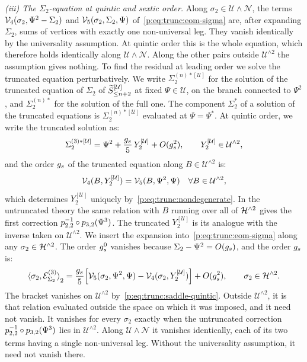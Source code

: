 \emph{(iii) The $\Sigma_2$-equation at quintic and sextic order.}
Along $\sigma_2 \in \mathcal U \wedge \mathcal N$, the terms $\vertex{4}(\sigma_2, \Psi^2 - \Sigma_2)$ and $\vertex{5}(\sigma_2, \Sigma_2, \Psi)$ of~\eqref{p:eq:trunc:eom-sigma} are, after expanding $\Sigma_2$, sums of vertices with exactly one non-universal leg.
They vanish identically by the universality assumption.
At quintic order this is the whole equation, which therefore holds identically along $\mathcal U \wedge \mathcal N$.
Along the other pairs outside $\mathcal U^{\wedge 2}$ the assumption gives nothing.
To find the residual at leading order we solve the truncated equation perturbatively.
We write $\Sigma_2^{(n)*[\mathcal U]}$ for the solution of the truncated equation of $\Sigma_2$ of $\caction[\le n+2]^{[\mathcal U]}$ at fixed $\Psi \in \mathcal U$, on the branch connected to $\Psi^2$, and $\Sigma_2^{(n)*}$ for the solution of the full one.
The component $\Sigma_2^*$ of a solution of the truncated equations is $\Sigma_2^{(n)*[\mathcal U]}$ evaluated at $\Psi = \Psi^*$.
At quintic order, we write the truncated solution as:
\begin{equation}
  \label{p:eq:trunc:expansion}
  \Sigma_2^{(3)*[\mathcal U]}
    = \Psi^2 + \frac{\gs}{5} \, Y_2^{[\mathcal U]} + O(\gs^2),
  \qquad
  Y_2^{[\mathcal U]} \in \mathcal U^{\wedge 2},
\end{equation}
and the order $\gs$ of the truncated equation along $B \in \mathcal U^{\wedge 2}$ is:
\begin{equation}
  \label{p:eq:trunc:saddle-quintic}
  \vertex{4}(B, Y_2^{[\mathcal U]})
    = \vertex{5}(B, \Psi^2, \Psi)
  \quad
  \forall B \in \mathcal U^{\wedge 2},
\end{equation}
which determines $Y_2^{[\mathcal U]}$ uniquely by~\eqref{p:eq:trunc:nondegenerate}.
In the untruncated theory the same relation with $B$ running over all of $\Hn{2}$ gives the first correction $\sprod{2}{2}^{-1} \circ \sprod{3}{2}(\Psi^3)$.
The truncated $Y_2^{[\mathcal U]}$ is its analogue with the inverse taken on $\mathcal U^{\wedge 2}$.
We insert the expansion into~\eqref{p:eq:trunc:eom-sigma} along any $\sigma_2 \in \Hn{2}$.
The order $\gs^0$ vanishes because $\Sigma_2 - \Psi^2 = O(\gs)$, and the order $\gs$ is:
\begin{equation}
\label{p:eq:trunc:residual}
\pair[2]{\sigma_2}{\mathcal E^{(3)}_{\Sigma_2}}
  = \frac{\gs}{5} \Big[
      \vertex{5}(\sigma_2, \Psi^2, \Psi)
      - \vertex{4}(\sigma_2, Y_2^{[\mathcal U]})
    \Big]
    + O(\gs^2),
\qquad
\sigma_2 \in \Hn{2}.
\end{equation}
The bracket vanishes on $\mathcal U^{\wedge 2}$ by~\eqref{p:eq:trunc:saddle-quintic}.
Outside $\mathcal U^{\wedge 2}$, it is that relation evaluated outside the space on which it was imposed, and it need not vanish.
It vanishes for every $\sigma_2$ exactly when the untruncated correction $\sprod{2}{2}^{-1} \circ \sprod{3}{2}(\Psi^3)$ lies in $\mathcal U^{\wedge 2}$.
Along $\mathcal U \wedge \mathcal N$ it vanishes identically, each of its two terms having a single non-universal leg.
Without the universality assumption, it need not vanish there.

